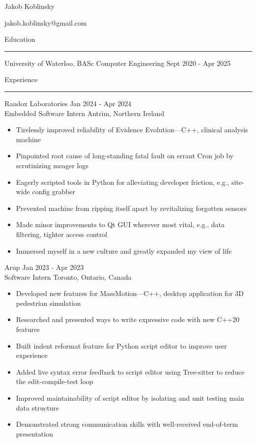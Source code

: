 \documentclass{article}
\newenvironment{mysection}[1]
{ {\large #1}

	\vspace{-1em}
	\rule{\linewidth}{0.4pt} 

} { \vspace{1em} }
\begin{document}

\begin{center}
{\huge Jakob Koblinsky}

jakob.koblinsky@gmail.com
\end{center}

\vspace{0.25in}

\begin{mysection}{Education}
University of Waterloo, BASc Computer Engineering \hfill Sept 2020 - Apr 2025
\end{mysection}

\begin{mysection}{Experience}
Randox Laboratories \hfill Jan 2024 - Apr 2024 \\
Embedded Software Intern \hfill Antrim, Northern Ireland
\begin{itemize}[noitemsep,left=0pt,label={--}]
	\item Tirelessly improved reliability of Evidence Evolution---C++, clinical analysis machine
	\item Pinpointed root cause of long-standing fatal fault on errant Cron job by scrutinizing meager logs
	\item Eagerly scripted tools in Python for alleviating developer friction, e.g., site-wide config grabber
	\item Prevented machine from ripping itself apart by revitalizing forgotten sensors
	\item Made minor improvements to Qt GUI wherever most vital, e.g., data filtering, tighter access control
	\item Immersed myself in a new culture and greatly expanded my view of life
\end{itemize}

Arup \hfill Jan 2023 - Apr 2023 \\
Software Intern \hfill Toronto, Ontario, Canada
\begin{itemize}[noitemsep,left=0pt,label={--}]
	\item Developed new features for MassMotion—C++, desktop application for 3D pedestrian simulation
	\item Researched and presented ways to write expressive code with new C++20 features
	\item Built indent reformat feature for Python script editor to improve user experience
	\item Added live syntax error feedback to script editor using Tree-sitter to reduce the edit-compile-test loop
	\item Improved maintainability of script editor by isolating and unit testing main data structure
	\item Demonstrated strong communication skills with well-received end-of-term presentation
\end{itemize}


\end{mysection}
\end{document}
